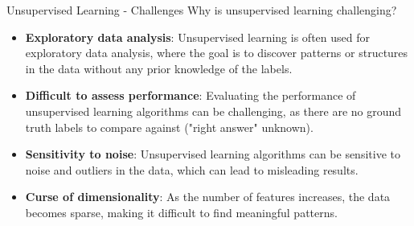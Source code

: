 \begin{frame}[allowframebreaks]{Unsupervised Learning - Challenges}
    Why is unsupervised learning challenging?
    \begin{itemize}
        \item \textbf{Exploratory data analysis}: Unsupervised learning is often used for exploratory data analysis, where the goal is to discover patterns or structures in the data without any prior knowledge of the labels.
        \item \textbf{Difficult to assess performance}: Evaluating the performance of unsupervised learning algorithms can be challenging, as there are no ground truth labels to compare against ("right answer" unknown).
        \item \textbf{Sensitivity to noise}: Unsupervised learning algorithms can be sensitive to noise and outliers in the data, which can lead to misleading results.
        \item \textbf{Curse of dimensionality}: As the number of features increases, the data becomes sparse, making it difficult to find meaningful patterns.
    \end{itemize}
\end{frame}